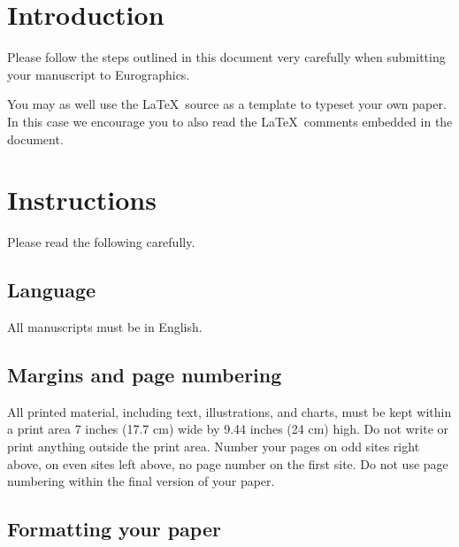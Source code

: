 \section{Introduction}

Please follow the steps outlined in this document very carefully when
submitting your manuscript to Eurographics.

You may as well use the \LaTeX\ source as a template to typeset your own
paper. In this case we encourage you to also read the \LaTeX\ comments
embedded in the document.

\section{Instructions}

Please read the following carefully.

\subsection{Language}

All manuscripts must be in English.

\subsection{Margins and page numbering}

All printed material, including text, illustrations, and charts,
must be kept within a print area %
7 inches (17.7 cm) wide by
9.44 inches (24 cm) high. Do not write or print anything
outside the print area. Number your pages on odd sites right
above, on even sites left above, no page number on the first site.
Do not use page numbering within the final version of your paper.


\subsection{Formatting your paper}

% 


